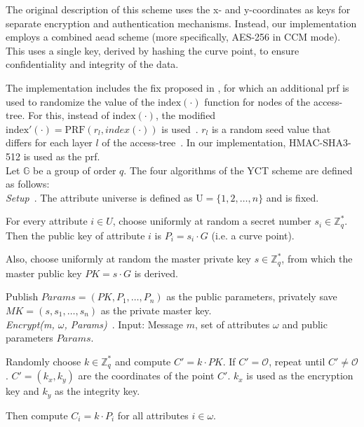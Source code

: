 The original description of this scheme uses the x- and y-coordinates as keys for separate encryption and authentication mechanisms.
Instead, our implementation employs a combined \acrshort{aead} scheme (more specifically, AES-256 in CCM mode).
This uses a single key, derived by hashing the curve point, to ensure confidentiality and integrity of the data.

The implementation includes the fix proposed in \cite{tan_enhancement_2019}, for which an additional \acrshort{prf} is used to randomize the value of the $\text{index}(\cdot)$ function for nodes of the \gls{access-tree}.
For this, instead of $\text{index}(\cdot)$, the modified $\text{index}'(\cdot) = \text{PRF}(r_l, index(\cdot))$ is used~\cite{tan_enhancement_2019}.
$r_l$ is a random seed value that differs for each layer $l$ of the \gls{access-tree}~\cite{tan_enhancement_2019}.
In our implementation, HMAC-SHA3-512 is used as the \acrshort{prf}.\\

Let $\mathbb{G}$ be a group of order $q$. The four algorithms of the YCT scheme are defined as follows: \\

\emph{Setup}~\cite{yao_lightweight_2015}.
The attribute universe is defined as $\text{U} = \{1, 2, \dots, n\}$ and is fixed.

For every attribute $i \in U$, choose uniformly at random a secret number $s_i \in \mathbb{Z}_q^*$.
Then the public key of attribute $i$ is $P_i = s_i \cdot G$ (i.e. a curve point).

Also, choose uniformly at random the master private key $s \in \mathbb{Z}_q^*$, from which the master public key $PK = s \cdot G$ is derived.

Publish $Params=(PK, P_1, \dots, P_n)$ as the public parameters, privately save $MK = (s, s_1, \dots, s_n)$ as the private master key.
\\

\emph{Encrypt(m, $\omega$, Params)}~\cite{yao_lightweight_2015}.
Input: Message $m$, set of attributes $\omega$ and public parameters $Params$.

Randomly choose $k \in \mathbb{Z}_q^*$ and compute $C' = k \cdot PK$. If $C' = \mathcal{O}$, repeat until $C' \neq \mathcal{O}$.
$C' = (k_x, k_y)$ are the coordinates of the point $C'$. $k_x$ is used as the encryption key and $k_y$ as the integrity key.

Then compute $C_i = k \cdot P_i$ for all attributes $i \in \omega$.

